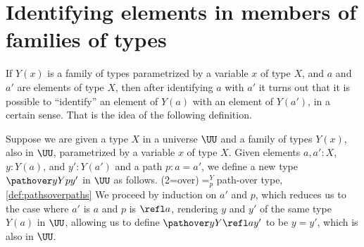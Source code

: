 \section{Identifying elements in members of families of types}

If $Y(x)$ is a family of types parametrized by a variable $x$ of type $X$, and $a$ and $a'$ are elements of type $X$, then after identifying $a$
with $a'$ it turns out that it is possible to ``identify'' an element of $Y(a)$ with an element of $Y(a')$, in a certain sense.  That is the
idea of the following definition.

\begin{definition}\label{def:pathsoverpaths}
  Suppose we are given a type $X$ in a universe $\UU$ and a family of types $Y(x)$, also in $\UU$, parametrized by a variable $x$ of type $X$.
  Given elements $a,a':X$, $y:Y(a)$, and
  $y':Y(a')$ and a path $p : a = a'$,
  we define a new type $\pathover y Y p {y'}$ in $\UU$ as follows.%
  \glossary(2=over){$=^Y_p$}{path-over type, \cref{def:pathsoverpaths}}
  We proceed by induction on $a'$ and $p$, which reduces us to the case where $a'$ is $a$ and $p$ is $\refl a$,
  rendering $y$ and $y'$ of the same type $Y(a)$ in $\UU$, allowing us to define
  $\pathover y Y {\refl a} {y'}$ to be $y = y'$, which is also in $\UU$.
\end{definition}

